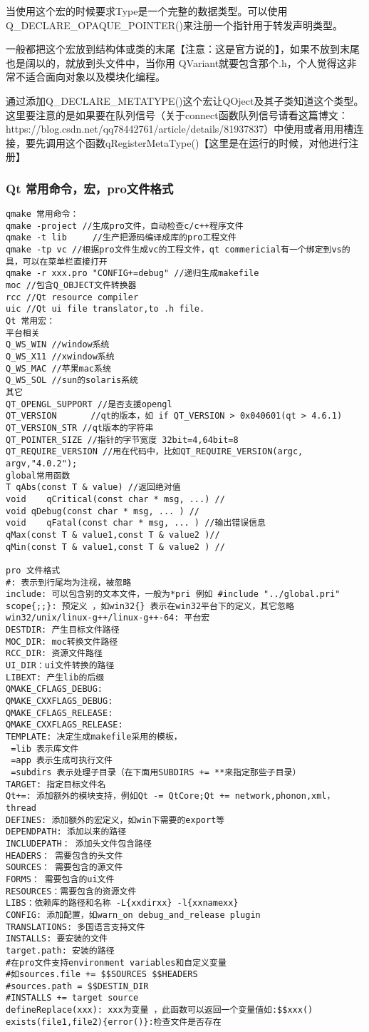 当使用这个宏的时候要求Type是一个完整的数据类型。可以使用Q\_DECLARE\_OPAQUE\_POINTER()来注册一个指针用于转发声明类型。

一般都把这个宏放到结构体或类的末尾【注意：这是官方说的】，如果不放到末尾也是阔以的，就放到头文件中，当你用 QVariant就要包含那个.h，个人觉得这非常不适合面向对象以及模块化编程。

通过添加Q\_DECLARE\_METATYPE()这个宏让QOject及其子类知道这个类型。这里要注意的是如果要在队列信号（关于connect函数队列信号请看这篇博文：https://blog.csdn.net/qq78442761/article/details/81937837）中使用或者用用槽连接，要先调用这个函数qRegisterMetaType()【这里是在运行的时候，对他进行注册】

\subsubsection{Qt 常用命令，宏，pro文件格式}
\begin{lstlisting}
qmake 常用命令：
qmake -project //生成pro文件，自动检查c/c++程序文件
qmake -t lib     //生产把源码编译成库的pro工程文件
qmake -tp vc //根据pro文件生成vc的工程文件，qt commericial有一个绑定到vs的具，可以在菜单栏直接打开
qmake -r xxx.pro "CONFIG+=debug" //递归生成makefile
moc //包含Q_OBJECT文件转换器
rcc //Qt resource compiler
uic //Qt ui file translator,to .h file.
Qt 常用宏：
平台相关
Q_WS_WIN //window系统
Q_WS_X11 //xwindow系统
Q_WS_MAC //苹果mac系统
Q_WS_SOL //sun的solaris系统
其它
QT_OPENGL_SUPPORT //是否支援opengl
QT_VERSION　　　　//qt的版本，如 if QT_VERSION > 0x040601(qt > 4.6.1)
QT_VERSION_STR //qt版本的字符串
QT_POINTER_SIZE //指针的字节宽度 32bit=4,64bit=8
QT_REQUIRE_VERSION //用在代码中，比如QT_REQUIRE_VERSION(argc, argv,"4.0.2");
global常用函数
T qAbs(const T & value) //返回绝对值
void	qCritical(const char * msg, ...) //
void qDebug(const char * msg, ... ) //
void	qFatal(const char * msg, ... ) //输出错误信息
qMax(const T & value1,const T & value2 )//
qMin(const T & value1,const T & value2 ) //
　　
pro 文件格式
#: 表示到行尾均为注视，被忽略
include: 可以包含别的文本文件，一般为*pri 例如 #include "../global.pri"
scope{;;}: 预定义 ，如win32{} 表示在win32平台下的定义，其它忽略
win32/unix/linux-g++/linux-g++-64: 平台宏
DESTDIR: 产生目标文件路径
MOC_DIR: moc转换文件路径
RCC_DIR: 资源文件路径
UI_DIR：ui文件转换的路径
LIBEXT: 产生lib的后缀
QMAKE_CFLAGS_DEBUG:
QMAKE_CXXFLAGS_DEBUG:
QMAKE_CFLAGS_RELEASE:
QMAKE_CXXFLAGS_RELEASE:
TEMPLATE: 决定生成makefile采用的模板，
 =lib 表示库文件
 =app 表示生成可执行文件
 =subdirs 表示处理子目录（在下面用SUBDIRS += **来指定那些子目录）
TARGET: 指定目标文件名
Qt+=: 添加额外的模块支持，例如Qt -= QtCore;Qt += network,phonon,xml，thread
DEFINES: 添加额外的宏定义，如win下需要的export等
DEPENDPATH: 添加以来的路径
INCLUDEPATH： 添加头文件包含路径
HEADERS： 需要包含的头文件
SOURCES： 需要包含的源文件
FORMS： 需要包含的ui文件
RESOURCES：需要包含的资源文件
LIBS：依赖库的路径和名称 -L{xxdirxx} -l{xxnamexx}
CONFIG: 添加配置，如warn_on debug_and_release plugin
TRANSLATIONS: 多国语言支持文件
INSTALLS: 要安装的文件
target.path: 安装的路径
#在pro文件支持environment variables和自定义变量
#如sources.file += $$SOURCES $$HEADERS
#sources.path = $$DESTIN_DIR
#INSTALLS += target source
defineReplace(xxx): xxx为变量 ，此函数可以返回一个变量值如:$$xxx()
exists(file1,file2){error()}:检查文件是否存在   
\end{lstlisting}
